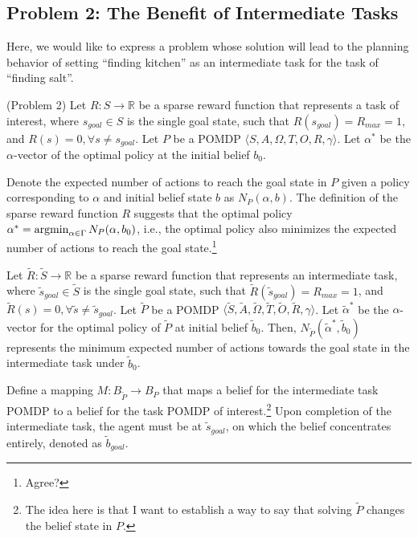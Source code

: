 \documentclass{article}
\newcommand{\td}[1]{\tilde{#1}}
\begin{document}
\subsection{Problem 2: The Benefit of Intermediate Tasks}
Here, we would like to express a problem whose solution will lead to the planning behavior of setting ``finding kitchen'' as an intermediate task for the task of ``finding salt''.

\begin{definition}(Problem 2)
Let $R:S\rightarrow \mathbb{R}$ be a sparse reward function that represents a
task of interest, where $s_{goal}\in S$ is the single goal state, such that
$R(s_{goal})=R_{max}=1$, and $R(s)=0, \forall s \neq s_{goal}$. Let $P$ be a POMDP $\langle S, A, \Omega, T, O, R, \gamma  \rangle$. Let $\alpha^*$ be the $\alpha$-vector of the optimal policy at the initial belief $b_0$.

Denote the expected number of actions to reach the goal state in $P$ given a policy corresponding to $\alpha$ and initial belief state $b$ as $N_P(\alpha, b)$. The definition of the sparse reward function $R$ suggests that the optimal policy $\alpha^*=\operatorname*{argmin}_{\alpha\in\Gamma}N_P(\alpha, b_0)$, i.e., the optimal policy also minimizes the expected number of actions to reach the goal state.\footnote{Agree?}



Let $\td{R}:\td{S}\rightarrow \mathbb{R}$ be a sparse reward function that represents an intermediate task, where $\td{s}_{goal}\in \td{S}$ is the single goal state, such that
$\td{R}(\td{s}_{goal})=R_{max}=1$, and $\td{R}(s)=0, \forall \td{s} \neq \td{s}_{goal}$. Let $\td{P}$ be a POMDP $\langle \td{S}, \td{A}, \td{\Omega}, \td{T}, \td{O}, \td{R}, \gamma  \rangle$. Let $\td{\alpha}^*$ be the $\alpha$-vector for the optimal policy of $\td{P}$ at initial belief $\td{b}_0$. Then, $N_{\td{P}}(\td{\alpha}^*, \td{b}_0)$ represents the minimum expected number of actions towards the goal state in the intermediate task under $\td{b}_0$.

Define a mapping $M:B_{\td{P}}\rightarrow B_{P}$ that maps a belief for the intermediate task POMDP to a belief for the task POMDP of interest.\footnote{The idea here is that I want to establish a way to say that solving $\td{P}$ changes the belief state in $P$.}
Upon completion of the intermediate task, the agent must be at $\td{s}_{goal}$, on which the belief concentrates entirely, denoted as $\td{b}_{goal}$.


\end{definition}
\end{document}
